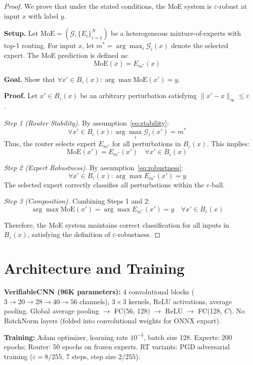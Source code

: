 \documentclass{article}
\theoremstyle{plain}
\theoremstyle{remark}
\begin{document}
\begin{proof}
We prove that under the stated conditions, the MoE system is $\varepsilon$-robust at input $x$ with label $y$.

\textbf{Setup.} Let $\mathrm{MoE} = (\mathcal{G}, \{E_i\}_{i=1}^N)$ be a heterogeneous mixture-of-experts with top-1 routing. For input $x$, let $m^* = \arg\max_i \mathcal{G}_i(x)$ denote the selected expert. The MoE prediction is defined as:
\[
\mathrm{MoE}(x) = E_{m^*}(x)
\]

\textbf{Goal.} Show that $\forall x' \in B_\varepsilon(x): \arg\max \mathrm{MoE}(x') = y$.

\textbf{Proof.} Let $x' \in B_\varepsilon(x)$ be an arbitrary perturbation satisfying $\|x' - x\|_\infty \leq \varepsilon$.

\textit{Step 1 (Router Stability).} By assumption~\eqref{eq:stability}:
\[
\forall x' \in B_\varepsilon(x): \arg\max_i \mathcal{G}_i(x') = m^*
\]
Thus, the router selects expert $E_{m^*}$ for all perturbations in $B_\varepsilon(x)$. This implies:
\[
\mathrm{MoE}(x') = E_{m^*}(x') \quad \forall x' \in B_\varepsilon(x)
\]

\textit{Step 2 (Expert Robustness).} By assumption~\eqref{eq:robustness}:
\[
\forall x' \in B_\varepsilon(x): \arg\max E_{m^*}(x') = y
\]
The selected expert correctly classifies all perturbations within the $\varepsilon$-ball.

\textit{Step 3 (Composition).} Combining Steps 1 and 2:
\[
\arg\max \mathrm{MoE}(x') = \arg\max E_{m^*}(x') = y \quad \forall x' \in B_\varepsilon(x)
\]

Therefore, the MoE system maintains correct classification for all inputs in $B_\varepsilon(x)$, satisfying the definition of $\varepsilon$-robustness.
\end{proof}

\section{Architecture and Training}
\label{app:architecture}

\textbf{VerifiableCNN (96K parameters):} 4 convolutional blocks ($3 \to 20 \to 28 \to 40 \to 56$ channels), $3 \times 3$ kernels, ReLU activations, average pooling. Global average pooling $\to$ FC(56, 128) $\to$ ReLU $\to$ FC(128, $C$). No BatchNorm layers (folded into convolutional weights for ONNX export).

\textbf{Training:} Adam optimizer, learning rate $10^{-3}$, batch size 128. Experts: 200 epochs; Router: 50 epochs on frozen experts. RT variants: PGD adversarial training ($\varepsilon = 8/255$, 7 steps, step size $2/255$).
\end{document}
